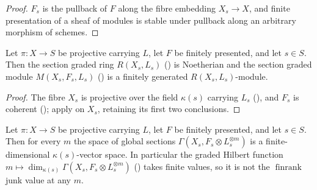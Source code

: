 \begin{proof}
  \leanok
  \(F_s\) is the pullback of \(F\) along the fibre embedding \(X_s \to X\), and
  finite presentation of a sheaf of modules is stable under pullback along an
  arbitrary morphism of schemes.
\end{proof}

\begin{lemma}
  \label{lem:sectionGradedModule_fg_fiber}
  \leanok
  Let \(\pi : X \to S\) be projective carrying \(L\), let \(F\) be finitely
  presented, and let \(s \in S\).  Then the section graded ring \(R(X_s, L_s)\)
  () is Noetherian and the section graded module
  \(M(X_s, F_s, L_s)\) () is a finitely generated
  \(R(X_s, L_s)\)-module.
\end{lemma}

\begin{proof}
  The fibre \(X_s\) is projective over the field \(\kappa(s)\) carrying \(L_s\)
  (), and \(F_s\) is coherent
  (); apply
   on \(X_s\), retaining its first two
  conclusions.
\end{proof}

\begin{lemma}
  \label{lem:hilbertFunction_finiteDimensional}
  \leanok
  Let \(\pi : X \to S\) be projective carrying \(L\), let \(F\) be finitely
  presented, and let \(s \in S\).  Then for every \(m\) the space of global
  sections \(\Gamma(X_s, F_s \otimes L_s^{\otimes m})\) is a finite-dimensional
  \(\kappa(s)\)-vector space.  In particular the graded Hilbert function
  \(m \mapsto \dim_{\kappa(s)} \Gamma(X_s, F_s \otimes L_s^{\otimes m})\)
  () takes finite values, so it is not the
  \(\operatorname{finrank}\) junk value at any \(m\).
\end{lemma}


